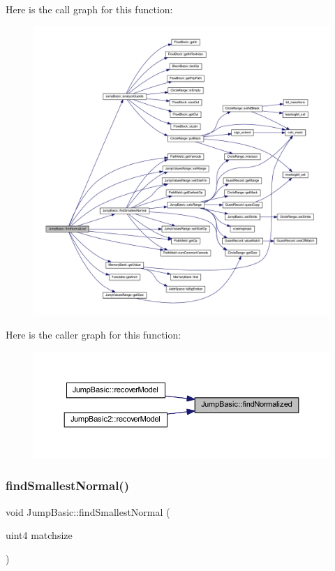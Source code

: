 Here is the call graph for this function\+:
\nopagebreak
\begin{figure}[H]
\begin{center}
\leavevmode
\includegraphics[width=350pt]{class_jump_basic_aefc7762595790f46334f6e09a88e4432_cgraph}
\end{center}
\end{figure}
Here is the caller graph for this function\+:
\nopagebreak
\begin{figure}[H]
\begin{center}
\leavevmode
\includegraphics[width=350pt]{class_jump_basic_aefc7762595790f46334f6e09a88e4432_icgraph}
\end{center}
\end{figure}
\mbox{\label{class_jump_basic_a32cfae8f5cf7b8573e09d415e2b1da52}} 
\subsubsection{\texorpdfstring{findSmallestNormal()}{findSmallestNormal()}}
{\footnotesize\ttfamily void Jump\+Basic\+::find\+Smallest\+Normal (\begin{DoxyParamCaption}\item[{uint4}]{matchsize }\end{DoxyParamCaption})\hspace{0.3cm}{\ttfamily [protected]}}




